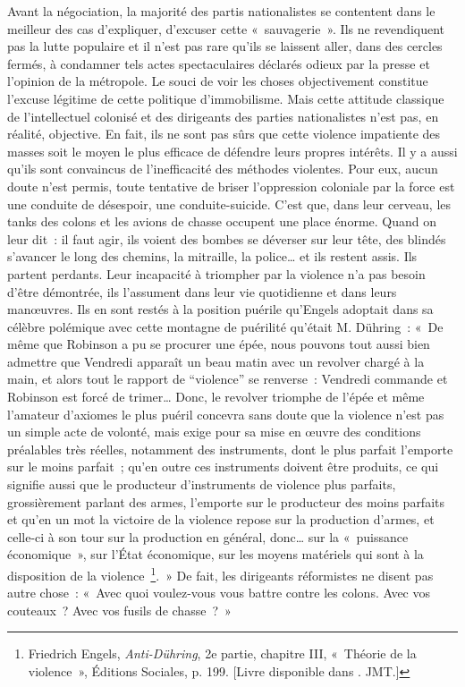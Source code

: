 \documentclass[french,twoside]{book} %
\begin{document}
 Avant la négociation, la majorité des partis nationalistes se contentent dans le meilleur des cas d’expliquer, d’excuser cette « sauvagerie ». Ils ne revendiquent pas la lutte populaire et il n’est pas rare qu’ils se laissent aller, dans des cercles fermés, à condamner tels actes spectaculaires déclarés odieux par la presse et l’opinion de la métropole. Le souci de voir les choses objectivement constitue l’excuse légitime de cette politique d’immobilisme. Mais cette attitude classique de l’intellectuel colonisé et des dirigeants des parties nationalistes n’est pas, en réalité, objective. En fait, ils ne sont pas sûrs que cette violence impatiente des masses soit le moyen le plus efficace de défendre leurs propres intérêts. Il y a aussi qu’ils sont convaincus de l’inefficacité des méthodes violentes. Pour eux, aucun doute n’est permis, toute tentative de briser l’oppression coloniale par la force est une conduite de désespoir, une conduite-suicide. C’est que, dans leur cerveau, les tanks des colons et les avions de chasse occupent une place énorme. Quand on leur dit : il faut agir, ils voient des bombes se déverser sur leur tête, des blindés s’avancer le long des chemins, la mitraille, la police… et ils restent assis. Ils partent perdants. Leur incapacité à triompher par la violence n’a pas besoin d’être démontrée, ils l’assument dans leur vie quotidienne et dans leurs manœuvres. Ils en sont restés à la position puérile qu’Engels adoptait dans sa célèbre polémique avec cette montagne de puérilité qu’était M. Dühring : « De même que Robinson a pu se procurer une épée, nous pouvons tout aussi bien admettre que Vendredi apparaît un beau matin avec un revolver chargé à la main, et alors tout le rapport de “violence” se renverse : Vendredi commande et Robinson est forcé de trimer… Donc, le revolver triomphe de l’épée et même l’amateur d’axiomes le plus puéril concevra sans doute que la violence n’est pas un simple acte de volonté, mais exige pour sa mise en œuvre des conditions préalables très réelles, notamment des instruments, dont le plus parfait l’emporte sur le moins parfait ; qu’en outre ces instruments doivent être produits, ce qui signifie aussi que le producteur d’instruments de violence plus parfaits, grossièrement parlant des armes, l’emporte sur le producteur   des moins parfaits et qu’en un mot la victoire de la violence repose sur la production d’armes, et celle-ci à son tour sur la production en général, donc… sur la « puissance économique », sur l’État économique, sur les moyens matériels qui sont à la disposition de la violence \footnote{Friedrich Engels, \emph{Anti-Dühring}, 2e partie, chapitre III, « Théorie de la violence », Éditions Sociales, p. 199. [Livre disponible dans \href{http://classiques.uqac.ca/classiques/Engels_friedrich/anti_duhring/anti_duhring.html}{}. JMT.]}. » De fait, les dirigeants réformistes ne disent pas autre chose : « Avec quoi voulez-vous vous battre contre les colons. Avec vos couteaux ? Avec vos fusils de chasse ? »\par
\end{document}
